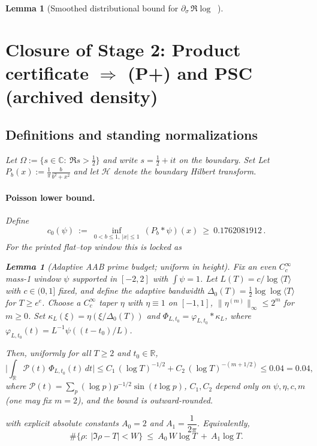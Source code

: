\documentclass[11pt]{article}
\providecommand{\CPstar}{0.04}%
\newtheorem{lemma}[theorem]{Lemma}
\theoremstyle{definition}
\theoremstyle{remark}
\newcommand{\C}{\mathbb{C}}
\newcommand{\R}{\mathbb{R}}
\newcommand{\Poisson}{P}
\DeclareMathOperator{\dettwo}{det_2}
\begin{document}
\begin{lemma}[Smoothed distributional bound for $\partial_\sigma\,\Re\log\dettwo$]
\section*{Closure of Stage 2: Product certificate $\Rightarrow$ (P+) and PSC (archived density)}

\subsection*{Definitions and standing normalizations}

Let $\Omega:=\{s\in\C:\ \Re s>\tfrac12\}$ and write $s=\tfrac12+it$ on the boundary.
Set
Let $\Poisson_b(x):=\frac{1}{\pi}\frac{b}{b^2+x^2}$ and let $\mathcal H$ denote the boundary Hilbert transform.

\paragraph{Poisson lower bound.}
Define
\[
 c_0(\psi)\ :=\ \inf_{0<b\le 1,\ |x|\le 1}\ (\Poisson_{b}*\psi)(x)\ \ge\ 0.1762081912\,.
\]
For the printed flat--top window this is locked as
\begin{lemma}[Adaptive AAB prime budget; uniform in height]\label{lem:adaptive-prime-budget}
Fix an even $C_c^\infty$ mass-1 window $\psi$ supported in $[-2,2]$ with $\int \psi =1$. Let $L(T) = c / \log \langle T \rangle$ with $c \in (0,1]$ fixed, and define the adaptive bandwidth $\Delta_0(T) = \tfrac{1}{2} \log \log \langle T \rangle$ for $T \ge e^e$. Choose a $C_c^\infty$ taper $\eta$ with $\eta \equiv 1$ on $[-1,1]$, $\|\eta^{(m)}\|_\infty \le 2^m$ for $m \ge 0$. Set $\widehat{\kappa_L}(\xi) = \eta(\xi / \Delta_0(T))$ and $\Phi_{L,t_0} = \varphi_{L,t_0} * \kappa_L$, where $\varphi_{L,t_0}(t) = L^{-1} \psi((t - t_0)/L)$.

Then, uniformly for all $T \ge 2$ and $t_0 \in \R$,
\[
\Big|\int_\R \mathcal P(t) \,\Phi_{L,t_0}(t)\,dt\Big| \le C_1 \, (\log T)^{-1/2} + C_2 \, (\log T)^{-(m + 1/2)} \le \CPstar = 0.04,
\]
where $\mathcal P(t) = \sum_p (\log p) p^{-1/2} \sin(t \log p)$, $C_1, C_2$ depend only on $\psi, \eta, c, m$ (one may fix $m=2$), and the bound is outward-rounded.
\end{lemma}
with explicit absolute constants $A_0=2$ and $A_1=\dfrac{1}{2\pi}$. Equivalently,
\[
 \#\big\{\rho:\ |\Im\rho-T|<W\big\}\ \le\ A_0\,W\log T\ +\ A_1\log T.
\]
\end{lemma}
\end{document}
